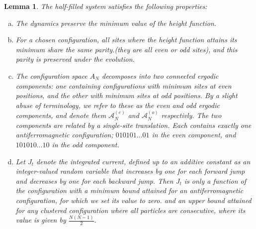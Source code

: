 \documentclass[pdflatex,sn-mathphys-num]{sn-jnl}
\newtheorem{lemma}[theorem]{Lemma}
\theoremstyle{definition}
\theoremstyle{remark}
\numberwithin{equation}{section}
\begin{document}
\begin{lemma}
\label{lemma1}
The half-filled system satisfies the following properties:

\begin{enumerate}[(a)]
    \item The dynamics preserve the minimum value of the height function.
    
    \item For a chosen configuration,  all sites where the height function attains its minimum share the same parity.(they are all even or odd sites), and this parity is preserved under the evolution.
    
    \item The configuration space $A_N$ decomposes into two connected ergodic components: one containing configurations with minimum sites at even positions, and the other with minimum sites at odd positions.
    By a slight abuse of terminology, we refer to these as the \textit{even} and \textit{odd} ergodic components, and denote them $\mathcal{A}_N^{(e)}$ and $\mathcal{A}_N^{(o)}$ respectivly.
    The two components are related by a single-site translation. Each contains exactly one antiferromagnetic configuration; \(010101\ldots01\) in the even component, and \(101010\ldots10\) in the odd component.
    
    \item Let \(J_t\) denote the integrated current, defined up to an additive constant as an integer-valued random variable that increases by one for each forward jump and decreases by one for each backward jump. Then \(J_t\) is only a function of the configuration with a minimum bound attained for an antiferromagnetic configuration, for which we set its value to zero. and an upper bound attained for any clustered configuration where all particles are consecutive, where its value is given by \(\frac{N(N - 1)}{2}\).
\end{enumerate}
\end{lemma}
\end{document}
